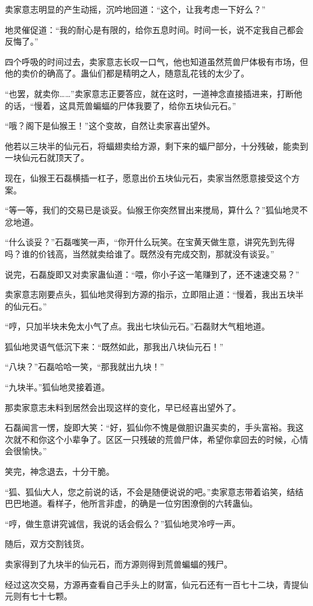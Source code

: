\begin{this_body}
卖家意志明显的产生动摇，沉吟地回道：“这个，让我考虑一下好么？”

地灵催促道：“我的耐心是有限的，给你五息时间。时间一长，说不定我自己都会反悔了。”

四个呼吸的时间过去，卖家意志长叹一口气，他也知道虽然荒兽尸体极有市场，但他的卖价的确高了。蛊仙们都是精明之人，随意乱花钱的太少了。

“也罢，就卖你……”卖家意志正要答应，就在这时，一道神念直接插进来，打断他的话，“慢着，这具荒兽蝙蝠的尸体我要了，给你五块仙元石。”

“哦？阁下是仙猴王！”这个变故，自然让卖家喜出望外。

他若以三块半的仙元石，将蝠翅卖给方源，剩下来的蝠尸部分，十分残破，能卖到一块仙元石就顶天了。

现在，仙猴王石磊横插一杠子，愿意出价五块仙元石，卖家当然愿意接受这个方案。

“等一等，我们的交易已是谈妥。仙猴王你突然冒出来搅局，算什么？”狐仙地灵不忿地道。

“什么谈妥？”石磊嗤笑一声，“你开什么玩笑。在宝黄天做生意，讲究先到先得吗？谁的价钱高，当然就卖给谁了。既然没有完成交割，那就没有谈妥。”

说完，石磊旋即又对卖家蛊仙道：“喂，你小子这一笔赚到了，还不速速交易？”

卖家意志刚要点头，狐仙地灵得到方源的指示，立即阻止道：“慢着，我出五块半的仙元石。”

“哼，只加半块未免太小气了点。我出七块仙元石。”石磊财大气粗地道。

狐仙地灵语气低沉下来：“既然如此，那我出八块仙元石！”

“八块？”石磊哈哈一笑，“那我就出九块！”

“九块半。”狐仙地灵接着道。

那卖家意志未料到居然会出现这样的变化，早已经喜出望外了。

石磊闻言一愣，旋即大笑：“好，狐仙你不愧是做胆识蛊买卖的，手头富裕。我这次就不和你这个小辈争了。区区一只残破的荒兽尸体，希望你拿回去的时候，心情会很愉快。”

笑完，神念退去，十分干脆。

“狐、狐仙大人，您之前说的话，不会是随便说说的吧。”卖家意志带着谄笑，结结巴巴地道。看样子，他所言非虚，的确是一位穷困潦倒的六转蛊仙。

“哼，做生意讲究诚信，我说的话会假么？”狐仙地灵冷哼一声。

随后，双方交割钱货。

卖家得到了九块半的仙元石，而方源则得到荒兽蝙蝠的残尸。

经过这次交易，方源再查看自己手头上的财富，仙元石还有一百七十二块，青提仙元则有七十七颗。


\end{this_body}
